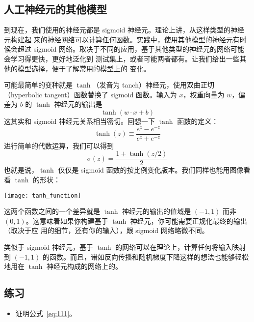 \subsection{人工神经元的其他模型}

到现在，我们使用的神经元都是 sigmoid 神经元。理论上讲，从这样类型的神经元构建起
来的神经网络可以计算任何函数。实践中，使用其他模型的神经元有时候会超过 sigmoid
网络。取决于不同的应用，基于其他类型的神经元的网络可能会学习得更快，更好地泛化到
测试集上，或者可能两者都有。让我们给出一些其他的模型选择，便于了解常用的模型上的
变化。

可能最简单的变种就是 $\tanh$（发音为 tanch）神经元，使用双曲正切（hyperbolic
  tangent）函数替换了 sigmoid 函数。输入为 $x$，权重向量为 $w$，偏差为 $b$ 的
$\tanh$ 神经元的输出是
\begin{equation}
  \tanh(w \cdot x+b)
  \label{eq:109}\tag{109}
\end{equation}
这其实和 sigmoid 神经元关系相当密切。回想一下 $\tanh$ 函数的定义：
\begin{equation}
  \tanh(z) \equiv \frac{e^z-e^{-z}}{e^z+e^{-z}}
  \label{eq:110}\tag{110}
\end{equation}
进行简单的代数运算，我们可以得到
\begin{equation} 
  \sigma(z) = \frac{1+\tanh(z/2)}{2}
  \label{eq:111}\tag{111}
\end{equation}
也就是说，$\tanh$ 仅仅是 sigmoid 函数的按比例变化版本。我们同样也能用图像看看
$\tanh$ 的形状：
\begin{center}
  \texttt{[image: tanh\_function]}
\end{center}

这两个函数之间的一个差异就是 $\tanh$ 神经元的输出的值域是 $(-1, 1)$ 而非 $(0,
1)$。这意味着如果你构建基于 $\tanh$ 神经元，你可能需要正规化最终的输出（取决于应
  用的细节，还有你的输入），跟 sigmoid 网络略微不同。

类似于 sigmoid 神经元，基于 $\tanh$ 的网络可以在理论上，计算任何将输入映射到
$(-1, 1)$ 的函数。而且，诸如反向传播和随机梯度下降这样的想法也能够轻松地用在
$\tanh$ 神经元构成的网络上的。

\subsection*{练习}

\begin{itemize}
\item 证明公式~\eqref{eq:111}。
\end{itemize}

